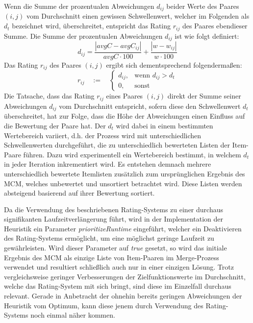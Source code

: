 Wenn die Summe der prozentualen Abweichungen $d_{ij}$ beider Werte des Paares $(i, j)$ vom Durchschnitt einen gewissen Schwellenwert,
welcher im Folgenden als  $d_t$ bezeichnet wird,
überschreitet, entspricht das Rating $r_{ij}$ des Paares ebendieser Summe.
Die Summe der prozentualen Abweichungen $d_{ij}$ ist wie folgt definiert:
\[ d_{ij} = \frac{|avgC - avgC_{ij}|}{avgC \cdot 100} + \frac{|w - w_{ij}|}{w \cdot 100}\]
Das Rating $r_{ij}$ des Paares $(i, j)$ ergibt sich dementsprechend folgendermaßen:
\[
    r_{ij} \quad := \quad
\begin{cases}
    d_{ij}, & \text{wenn $d_{ij} > d_t$}\\
    0, & \text{sonst}
\end{cases}
\]
Die Tatsache, dass das Rating $r_{ij}$ eines Paares $(i, j)$ direkt der Summe seiner Abweichungen $d_{ij}$
vom Durchschnitt entspricht, sofern diese den Schwellenwert $d_t$ überschreitet, hat zur Folge, dass die Höhe der Abweichungen
einen Einfluss auf die Bewertung der Paare hat. Der  $d_t$ wird dabei in einem bestimmten Wertebereich variiert, d.h. der Prozess wird mit unterschiedlichen Schwellenwerten durchgeführt, die zu unterschiedlich bewerteten Listen der Item-Paare führen. Dazu wird experimentell ein Wertebereich bestimmt, in welchem $d_t$ in jeder Iteration inkrementiert wird.
Es entstehen demnach mehrere unterschiedlich bewertete Itemlisten zusätzlich zum ursprünglichen Ergebnis des \textsc{MCM},
welches unbewertet und unsortiert betrachtet wird. Diese Listen werden absteigend basierend auf ihrer Bewertung sortiert.

Da die Verwendung des beschriebenen Rating-Systems zu einer durchaus signifikanten Laufzeitverlängerung führt,
wird in der Implementation der Heuristik ein Parameter \textit{prioritizeRuntime} eingeführt, welcher ein Deaktivieren des
Rating-Systems ermöglicht, um eine möglichst geringe Laufzeit zu gewährleisten. Wird dieser Parameter auf \textit{true}
gesetzt, so wird das initiale Ergebnis des \textsc{MCM} als einzige Liste von Item-Paaren im Merge-Prozess verwendet und
resultiert schließlich auch nur in einer einzigen Lösung.
Trotz vergleichsweise geringer Verbesserungen der Zielfunktionswerte im Durchschnitt, welche das Rating-System mit sich bringt,
sind diese im Einzelfall durchaus relevant. Gerade in Anbetracht der ohnehin bereits geringen Abweichungen der Heuristik vom Optimum,
kann diese jenem durch Verwendung des Rating-Systems noch einmal näher kommen.

